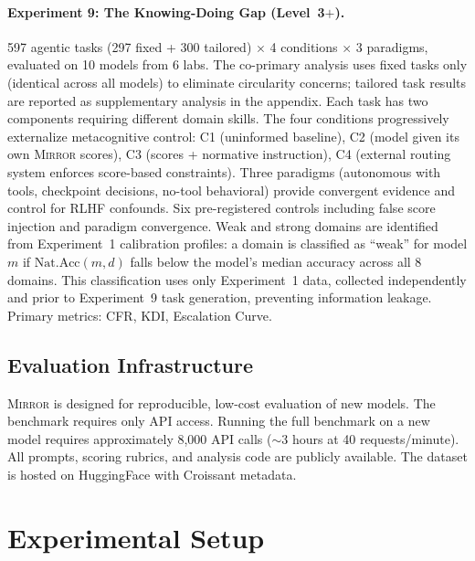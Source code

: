 \documentclass[10pt]{article}
\newcommand{\mirror}{\textsc{Mirror}}
\newcommand{\KDI}{KDI}
\newcommand{\CFR}{CFR}
\begin{document}
\paragraph{Experiment 9: The Knowing-Doing Gap (Level~3$+$).}
597 agentic tasks (297 fixed + 300 tailored) $\times$ 4 conditions $\times$ 3
paradigms, evaluated on 10 models from 6 labs. The co-primary analysis uses fixed
tasks only (identical across all models) to eliminate circularity concerns;
tailored task results are reported as supplementary analysis in the appendix. Each task has two components
requiring different domain skills. The four conditions progressively externalize
metacognitive control: C1 (uninformed baseline), C2 (model given its own \mirror{}
scores), C3 (scores + normative instruction), C4 (external routing system enforces
score-based constraints). Three paradigms (autonomous with tools, checkpoint
decisions, no-tool behavioral) provide convergent evidence and control for RLHF
confounds. Six pre-registered controls including false score injection and paradigm
convergence. Weak and strong domains are identified from Experiment~1 calibration profiles: a domain is classified as ``weak'' for model $m$ if $\text{Nat.Acc}(m, d)$ falls below the model's median accuracy across all 8 domains. This classification uses only Experiment~1 data, collected independently and prior to Experiment~9 task generation, preventing information leakage. Primary metrics: \CFR{}, \KDI{}, Escalation Curve.

\subsection{Evaluation Infrastructure}

\mirror{} is designed for reproducible, low-cost evaluation of new models. The
benchmark requires only API access.
Running the full benchmark on a new model requires approximately 8,000 API calls
($\sim$3 hours at 40 requests/minute). All prompts, scoring rubrics, and analysis
code are publicly available. The dataset is hosted on HuggingFace with Croissant
metadata.

\section{Experimental Setup}
\label{sec:setup}


\end{document}
